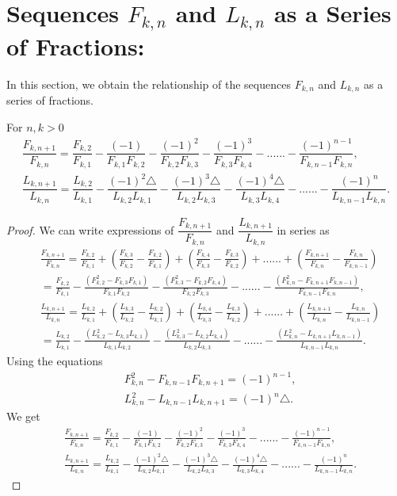  \section{Sequences $F_{k,n}$ and $L_{k,n}$ as a Series of Fractions:}
 In this section, we obtain the relationship of the sequences $F_{k,n}$ and $L_{k,n}$ as a series of fractions.
 \begin{theorem} For $ n, k > 0$
\begin{align*}
 \dfrac{F_{k,n+1}}{F_{k,n}} = \dfrac{F_{k,2}}{F_{k,1}} - \dfrac{(-1)}{F_{k,1}F_{k,2}}- \dfrac{(-1)^2}{F_{k,2}F_{k,3}}- \dfrac{(-1)^3}{F_{k,3}F_{k,4}} - ......-  \dfrac{(-1)^{n-1}}{F_{k,n-1}F_{k,n}},\\
\dfrac{L_{k,n+1}}{L_{k,n}} = \dfrac{L_{k,2}}{L_{k,1}} - \dfrac{(-1)^2 \triangle}{L_{k,2}L_{k,1}}- \dfrac{(-1)^3 \triangle}{L_{k,2}L_{k,3}}- \dfrac{(-1)^4 \triangle}{L_{k,3}L_{k,4}} - ......-  \dfrac{(-1)^{n}}{L_{k,n-1}L_{k,n}}.
\end{align*}
\end{theorem}
 \begin{proof}
We can write expressions of $\dfrac{F_{k,n+1}}{F_{k,n}}$ and $\dfrac{L_{k,n+1}}{L_{k,n}}$ in series as
\begin{align*}
&\frac{F_{k,n+1}}{F_{k,n}}= \frac{F_{k,2}}{F_{k,1}} +\left(\frac{F_{k,3}}{F_{k,2}}- \frac{F_{k,2}}{F_{k,1}}\right) + \left(\frac{F_{k,4}}{F_{k,3}}- \frac{F_{k,3}}{F_{k,2}}\right)+......+\left(\frac{F_{k,n+1}}{F_{k,n}}- \frac{F_{k,n}}{F_{k,n-1}}\right)\\
&= \frac{F_{k,2}}{F_{k,1}} - \frac{( F_{k,2}^2 - F_{k,3} F_{k,1})}{F_{k,1} F_{k,2}} - \frac{( F_{k,3}^2 - F_{k,2} F_{k,4})}{F_{k,2} F_{k,3}} - ......- \frac{( F_{k,n}^2 - F_{k,n+1} F_{k,n-1})}{F_{k,n-1} F_{k,n}},\\
&\frac{L_{k,n+1}}{L_{k,n}}= \frac{L_{k,2}}{L_{k,1}} +\left(\frac{L_{k,3}}{L_{k,2}}- \frac{L_{k,2}}{L_{k,1}}\right) + \left(\frac{L_{k,4}}{L_{k,3}}- \frac{L_{k,3}}{L_{k,2}}\right)+......+\left(\frac{L_{k,n+1}}{L_{k,n}}- \frac{L_{k,n}}{L_{k,n-1}}\right)\\
&= \frac{L_{k,2}}{L_{k,1}} - \frac{( L_{k,2}^2 - L_{k,3} L_{k,1})}{L_{k,1} L_{k,2}} - \frac{( L_{k,3}^2 - L_{k,2} L_{k,4})}{L_{k,2} L_{k,3}} - ......- \frac{( L_{k,n}^2 - L_{k,n+1} L_{k,n-1})}{L_{k,n-1} L_{k,n}}.
\end{align*}
Using the equations
 \begin{align*}
  &F_{k,n}^2 - F_{k,n-1}F_{k,n+1}=(-1)^{n-1},\\
  &L_{k,n}^2 - L_{k,n-1}L_{k,n+1}= (-1)^n \triangle.
 \end{align*}
 We get
 \begin{align*}
 & \frac{F_{k,n+1}}{F_{k,n}} = \frac{F_{k,2}}{F_{k,1}} - \frac{(-1)}{F_{k,1}F_{k,2}}- \frac{(-1)^2}{F_{k,2}F_{k,3}}- \frac{(-1)^3}{F_{k,3}F_{k,4}} - ......-  \frac{(-1)^{n-1}}{F_{k,n-1}F_{k,n}},\\
 &\frac{L_{k,n+1}}{L_{k,n}} = \frac{L_{k,2}}{L_{k,1}} - \frac{(-1)^2 \triangle}{L_{k,2}L_{k,1}}- \frac{(-1)^3 \triangle}{L_{k,2}L_{k,3}}- \frac{(-1)^4 \triangle}{L_{k,3}L_{k,4}} - ......-  \frac{(-1)^{n}}{L_{k,n-1}L_{k,n}}.
 \end{align*}
 \end{proof}

